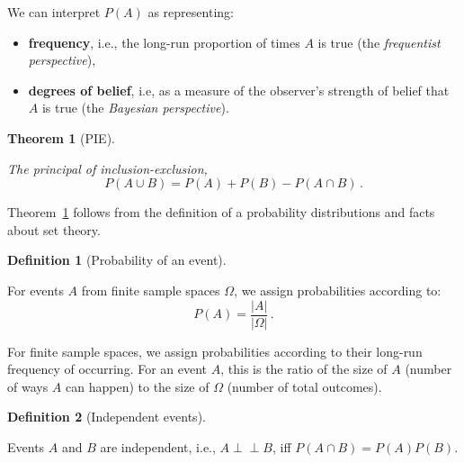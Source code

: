 \documentclass[
  a4paper,
  oneside]{book}
\providecommand{\tightlist}{%
  \setlength{\itemsep}{0pt}\setlength{\parskip}{0pt}}\usepackage{longtable,booktabs,array}
\theoremstyle{definition}
\newtheorem{definition}{Definition}[chapter]
\theoremstyle{definition}
\theoremstyle{definition}
\theoremstyle{plain}
\newtheorem{theorem}{Theorem}[chapter]
\theoremstyle{remark}
\begin{document}
\begin{tcolorbox}[enhanced jigsaw, colframe=quarto-callout-tip-color-frame, breakable, toprule=.15mm, bottomrule=.15mm, title=\textcolor{quarto-callout-tip-color}{\faLightbulb}\hspace{0.5em}{Tip}, arc=.35mm, opacityback=0, left=2mm, opacitybacktitle=0.6, bottomtitle=1mm, toptitle=1mm, titlerule=0mm, rightrule=.15mm, colback=white, colbacktitle=quarto-callout-tip-color!10!white, coltitle=black, leftrule=.75mm]

We can interpret \(P(A)\) as representing:

\begin{itemize}
\tightlist
\item
  \textbf{frequency}, i.e., the long-run proportion of times \(A\) is
  true (the \emph{frequentist perspective}),
\item
  \textbf{degrees of belief}, i.e, as a measure of the observer's
  strength of belief that \(A\) is true (the \emph{Bayesian
  perspective}).
\end{itemize}

\end{tcolorbox}

\begin{theorem}[PIE]\protect\hypertarget{thm-pie}{}\label{thm-pie}

The principal of inclusion-exclusion,
\[P(A\cup B) = P(A) + P(B) - P(A\cap B)\,.\]

\end{theorem}

Theorem~\ref{thm-pie} follows from the definition of a probability
distributions and facts about set theory.

\begin{definition}[Probability of an
event]\protect\hypertarget{def-prob-finite}{}\label{def-prob-finite}

For events \(A\) from finite sample spaces \(\Omega\), we assign
probabilities according to: \[P(A) = \frac{|A|}{|\Omega|} \,.\]

\end{definition}

For finite sample spaces, we assign probabilities according to their
long-run frequency of occurring. For an event \(A\), this is the ratio
of the size of \(A\) (number of ways \(A\) can happen) to the size of
\(\Omega\) (number of total outcomes).

\begin{definition}[Independent
events]\protect\hypertarget{def-indep}{}\label{def-indep}

Events \(A\) and \(B\) are independent, i.e.,
\(A \perp \!\!\! \perp B\), iff \(P(A\cap B) = P(A)P(B)\).

\end{definition}
\end{document}
